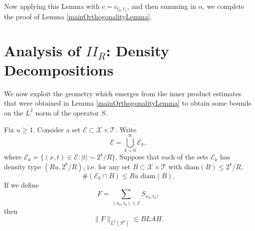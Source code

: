 \begin{comment}
%
\[ R^{\frac{d+1}{2}} \int \int_{E_{x_0}} \int_{F_y^{-1}(E_{x_0})} c_{t_0,t_1}(s) \eta(s,y,z) (\partial^{\frac{d-1}{2}} \widehat{\chi} )(R(s + |z|))\; dz\; dy\; ds. \]
%
TODO: Does integrating by parts in the $t$ and $t'$ variable do anything for us? Is this where we need oscillation. If $|t_0 - t_1 + d_g(x_0,x_1)| \geq 10/R$, then we conclude this quantity is
%
\begin{align*}
    & O_N \Big( R^{\frac{d+1}{2}-N} \int \int_{E_{x_0}} \int_{F_y^{-1}(E_{x_0})} |c_{t_0,t_1}(s)| |\eta(s,y,z)| (s + |z|)^{-N}\; dz\; dy\; ds \Big)\\
    &\quad\quad O_N \Big( R^{\frac{d+1}{2} - N} |t_0 - t_1 + d_g(x_0,x_1)|^{-N} |E_{x_0}| |E_{x_1}| \| c_{t_0,t_1} \|_{L^1} \Big)
\end{align*}
%
If $|E_{x_0}|$ and $|E_{x_1}|$ are both proportional to $1/R^d$, then this quantity is
%
\begin{align*}
    & O_N \Big( R^{-\frac{3d-1}{2} - N} |t_0 - t_1 + d_g(x_0,x_1)|^{-N} \| c_{t_0,t_1} \|_{L^1} \Big)\\
    &\quad = O_N \Big( R^{-\frac{3d-1}{2} - 1/p^* - N} (t_0 - t_1 + d_g(x_0,x_1))^{-N} \| b_{t_0} \|_{L^p} \| b_{t_1} \|_{L^p} \Big)\\
    &\quad = O_N \Big( t_0^{s_p} t_1^{s_p} R^{-\frac{3d-1}{2} - 1/p^* - N} (t_0 - t_1 + d_g(E_{x_0}, E_{x_1}))^{-N} \Big)
\end{align*}

\end{comment}

Now applying this Lemma with $c = c_{t_0,t_1}$, and then summing in $\alpha$, we complete the proof of Lemma \ref{mainOrthogonalityLemma}.


\section{Analysis of $II_R$: Density Decompositions}

We now exploit the geometry which emerges from the inner product estimates that were obtained in Lemma \ref{mainOrthogonalityLemma} to obtain some bounds on the $L^2$ norm of the operator $S$.

\begin{lemma}
    Fix $u \geq 1$. Consider a set $\mathcal{E} \subset \mathcal{X} \times \mathcal{T}$. Write
    \[ \mathcal{E} = \bigcup_{k = 0}^\infty \mathcal{E}_k, \]
    where $\mathcal{E}_k = \{ (x,t) \in \mathcal{E}: |t| \sim 2^k / R \}$. Suppose that each of the sets $\mathcal{E}_k$ has density type $(Ru,2^k / R)$, i.e. for any set $B \subset \mathcal{X} \times \mathcal{T}$ with $\text{diam}(B) \leq 2^k / R$,
    \[ \#( \mathcal{E}_k \cap B ) \leq Ru\; \text{diam}(B). \]
    If we define
    \[ F = \sum_{(x_0,t_0) \in \mathcal{E}} {S\!}_{x_0,t_0}, \]
    then
    \[ \| F \|_{L^2(S^d)} \lesssim BLAH. \]
\end{lemma}

